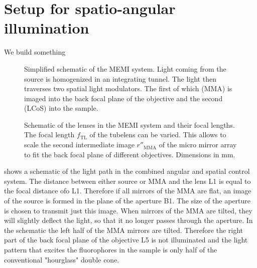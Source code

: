 
\newcommand{\imagw}[3]{
  \begin{figure}[!hbt]
    \centering
    \texttt{[image: \#2]}
    \caption{#3}
    \label{fig:#2}
  \end{figure}
}

\newcommand{\imag}[2]{\imagw{16cm}{#1}{#2}}

\chapter{Setup for spatio-angular illumination}
\begin{summary}
  We build something
\end{summary}



\begin{figure}[!hbt]
  \centering
  \def\svgscale{1.5}
  
  \caption{Simplified schematic of the MEMI system. Light coming from
    the source is homogenized in an integrating tunnel. The light then
    traverses two spatial light modulators. The first of which (MMA)
    is imaged into the back focal plane of the objective and the
    second (LCoS) into the sample.}
  \label{fig:memi-simple}
\end{figure}



\begin{figure}
   \centering
   \def\svgscale{2}
   
   \caption{Schematic of the lenses in the MEMI system and their focal
     lengths. The focal length $f_\textrm{TL}$ of the tubelens can be
     varied. This allows to scale the second intermediate image
     $r''_\textrm{MMA}$ of the micro mirror array to fit the back
     focal plane of different objectives. Dimensions in mm.}
   \label{fig:memi-sketch}
 \end{figure}


 shows a schematic of the light path in
the combined angular and spatial control system. The distance between
either source or MMA and the lens L1 is equal to the focal distance ofo
L1. Therefore if all mirrors of the MMA are flat, an image of the
source is formed in the plane of the aperture B1. The size of the
aperture is chosen to transmit just this image. When mirrors of the
MMA are tilted, they will slightly deflect the light, so that it no
longer passes through the aperture.  In the schematic the left half of
the MMA mirrors are tilted. Therefore the right part of the back focal
plane of the objective L5 is not illuminated and the light pattern
that excites the fluorophores in the sample is only half of the
conventional "hourglass" double cone.

